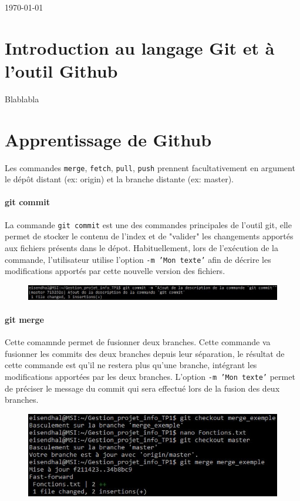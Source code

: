 \documentclass[11pt,canadien]{article}
\begin{document}
\begin{titlepage}

{\large \today}\\[2cm]

\vfill %

\end{titlepage}

\newpage
\tableofcontents

\newpage
\section{Introduction au langage Git et à l'outil Github}
Blablabla

\newpage
\section{Apprentissage de Github}
Les commandes \texttt{merge}, \texttt{fetch}, \texttt{pull}, \texttt{push} prennent facultativement en argument le dépôt distant (ex: origin) et la branche distante (ex: master).

\paragraph{git commit}La commande \texttt{git commit} est une des commandes principales de l'outil git, elle permet de stocker le contenu de l'index et de "valider" les changements apportés aux fichiers présents dans le dépot. Habituellement, lors de
l'exécution de la commande, l'utilisateur utilise l'option \texttt{-m 'Mon texte'} afin de décrire les modifications apportés par cette nouvelle version des fichiers.
\begin{figure}[H]
	\centering
	\includegraphics[width=\textwidth]{images/git_commit.jpg}
\end{figure}

\paragraph{git merge}Cette comamnde permet de fusionner deux branches. Cette commande va fusionner les commits des deux branches depuis leur séparation, le résultat de cette commande est qu'il ne restera plus qu'une branche, intégrant les
modifications apportées par les deux branches. L'option \texttt{-m 'Mon texte'} permet de préciser le message du commit qui sera effectué lors de la fusion des deux branches.
\begin{figure}[H]
	\centering
	\includegraphics[width=\textwidth]{images/git_merge.jpg}
\end{figure}
\end{document}
